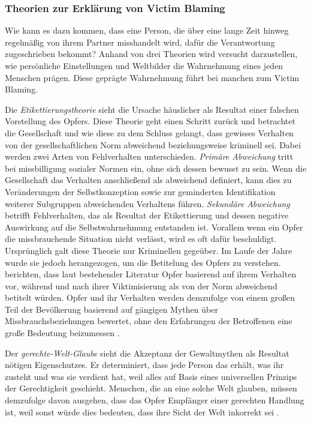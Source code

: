 \subsubsection{Theorien zur Erklärung von Victim Blaming}     \label{2.1.3.3}
Wie kann es dazu kommen, dass eine Person, die über eine lange Zeit hinweg regelmäßig von ihrem Partner misshandelt wird, dafür die Verantwortung zugeschrieben bekommt? Anhand von drei Theorien wird versucht darzustellen, wie persönliche Einstellungen und Weltbilder die Wahrnehmung eines jeden Menschen prägen. Diese geprägte Wahrnehmung führt bei manchen zum Victim Blaming.

Die \textit{Etikettierungstheorie} sieht die Ursache häuslicher als Resultat einer falschen Vorstellung des Opfers. Diese Theorie geht einen Schritt zurück und betrachtet die Gesellschaft und wie diese zu dem Schluss gelangt, dass gewisses Verhalten von der gesellschaftlichen Norm abweichend beziehungsweise kriminell sei. Dabei werden zwei Arten von Fehlverhalten unterschieden. \textit{Primäre Abweichung} tritt bei missbilligung sozialer Normen ein, ohne sich dessen bewusst zu sein. Wenn die Gesellschaft das Verhalten anschließend als abweichend definiert, kann dies zu Veränderungen der Selbstkonzeption sowie zur geminderten Identifikation weiterer Subgruppen abweichenden Verhaltens führen. \textit{Sekundäre Abweichung} betrifft Fehlverhalten, das als Resultat der Etikettierung und dessen negative Auswirkung auf die Selbstwahrnehmung entstanden ist. Vorallem wenn ein Opfer die missbrauchende Situation nicht verlässt, wird es oft dafür beschuldigt. Ursprünglich galt diese Theorie nur Kriminellen gegeüber. Im Laufe der Jahre wurde sie jedoch herangezogen, um die Betitelung des Opfers zu verstehen. \textcite{Labelingtheory_plus} berichten, dass laut bestehender Literatur Opfer basierend auf ihrem Verhalten vor, während und nach ihrer Viktimisierung als von der Norm abweichend betitelt würden. Opfer und ihr Verhalten werden demzufolge von einem großen Teil der Bevölkerung basierend auf gängigen Mythen über Missbrauchsbeziehungen bewertet, ohne den Erfahrungen der Betroffenen eine große Bedeutung beizumessen \parencite{Labelingtheory_plus}.

Der \textit{gerechte-Welt-Glaube} sieht die Akzeptanz der Gewaltmythen als Resultat nötigen Eigenschutzes. Er determiniert, dass jede Person das erhält, was ihr zusteht und was sie verdient hat, weil alles auf Basis eines universellen Prinzips der Gerechtigkeit geschieht. Menschen, die an eine solche Welt glauben, müssen demzufolge davon ausgehen, dass das Opfer Empfänger einer gerechten Handlung ist, weil sonst würde dies bedeuten, dass ihre Sicht der Welt inkorrekt sei \parencite{GM_Theorien}. 

